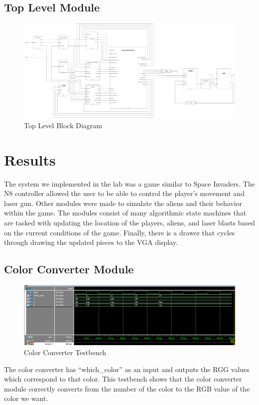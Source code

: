 \documentclass[11pt, titlepage]{article}
\begin{document}
        \subsection{Top Level Module}
            \begin{figure}[H]
                \centering
                \includegraphics[scale = 0.17]{Images/Top Level Module Block Diagram.pdf}
                \caption{Top Level Block Diagram}
            \end{figure}

    \section{Results}
    The system we implemented in the lab was a game similar to Space Invaders. The N8 controller allowed the user to be able to control the player's movement and laser gun. Other modules were made to simulate the aliens and their behavior within the game. The modules consist of many algorithmic state machines that are tasked with updating the location of the players, aliens, and laser blasts based on the current conditions of the game. Finally, there is a drawer that cycles through drawing the updated pieces to the VGA display.

        \subsection{Color Converter Module}
            \begin{figure}[H]
                \centering
                \includegraphics[scale = 0.53]{Images/Testbench Color Converter .png}
                \caption{Color Converter Testbench}
            \end{figure}
            The color converter has ``which\_color'' as an input and outputs the RGG values which correspond to that color. This testbench shows that the color converter module correctly converts from the number of the color to the RGB value of the color we want.
\end{document}
